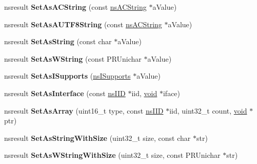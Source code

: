 \begin{DoxyCompactItemize}
nsresult {\bfseries Set\+As\+A\+C\+String} (const \hyperlink{structns_c_string_container}{ns\+A\+C\+String} $\ast$a\+Value)
\item 
\mbox{\label{interfacens_i_writable_variant_aebaf1fee55dfb4b56e691e616ac7c896}} 
nsresult {\bfseries Set\+As\+A\+U\+T\+F8\+String} (const \hyperlink{structns_c_string_container}{ns\+A\+C\+String} $\ast$a\+Value)
\item 
\mbox{\label{interfacens_i_writable_variant_a11fc3ac6b3534a33a9ffd32bbc35ff7a}} 
nsresult {\bfseries Set\+As\+String} (const char $\ast$a\+Value)
\item 
\mbox{\label{interfacens_i_writable_variant_aa1fbc401cce0623aa7f8557fb2edcc15}} 
nsresult {\bfseries Set\+As\+W\+String} (const P\+R\+Unichar $\ast$a\+Value)
\item 
\mbox{\label{interfacens_i_writable_variant_a6472805e80125c676c4c0d0e92057014}} 
nsresult {\bfseries Set\+As\+I\+Supports} (\hyperlink{interfacens_i_supports}{ns\+I\+Supports} $\ast$a\+Value)
\item 
\mbox{\label{interfacens_i_writable_variant_a26b5e11f360118c88507790b12729721}} 
nsresult {\bfseries Set\+As\+Interface} (const \hyperlink{struct___i_i_d}{ns\+I\+ID} $\ast$iid, \hyperlink{interfacevoid}{void} $\ast$iface)
\item 
\mbox{\label{interfacens_i_writable_variant_ab5e12425add3a03ca94f9d120c7820af}} 
nsresult {\bfseries Set\+As\+Array} (uint16\+\_\+t type, const \hyperlink{struct___i_i_d}{ns\+I\+ID} $\ast$iid, uint32\+\_\+t count, \hyperlink{interfacevoid}{void} $\ast$ptr)
\item 
\mbox{\label{interfacens_i_writable_variant_acec39c762c9a5fb7f8aa070636eaa6ff}} 
nsresult {\bfseries Set\+As\+String\+With\+Size} (uint32\+\_\+t size, const char $\ast$str)
\item 
\mbox{\label{interfacens_i_writable_variant_a35f61ceb593e6d59036ff5b2f34a9fc1}} 
nsresult {\bfseries Set\+As\+W\+String\+With\+Size} (uint32\+\_\+t size, const P\+R\+Unichar $\ast$str)

\end{DoxyCompactItemize}
